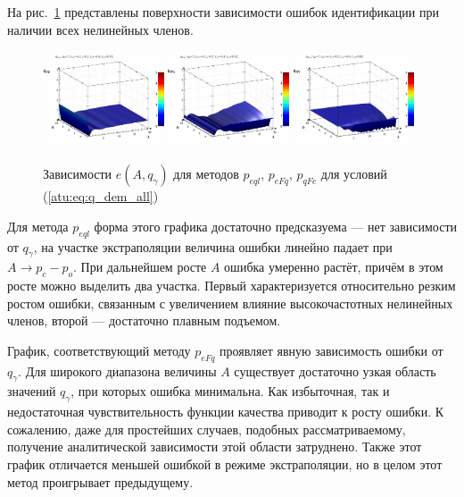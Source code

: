 На рис.~\ref{atu:f:qsl_pe_A_qg_all} представлены поверхности зависимости ошибок идентификации
при наличии всех нелинейных членов.


\begin{figure}[htb!]
  \centerline{
    \includegraphics[width=0.32\textwidth]{p/qls_pe-p_A_qg_eql_all.png}
    \hfill
    \includegraphics[width=0.32\textwidth]{p/qls_pe-p_A_qg_eFq_all.png}
    \hfill
    \includegraphics[width=0.32\textwidth]{p/qls_pe-p_A_qg_eFc_all.png}
  }
  \caption{Зависимости $e(A,q_\gamma)$ для методов $p_{eql}$, $p_{eFq}$, $p_{qFc}$ для условий (\ref{atu:eq:q_dem_all})}
  \label{atu:f:qsl_pe_A_qg_all}
\end{figure}

Для метода $p_{eql}$
форма этого графика достаточно предсказуема --- нет зависимости от $q_\gamma$,
на участке экстраполяции величина ошибки линейно падает при $A \to p_c - p_o$. При дальнейшем росте $A$
ошибка умеренно растёт, причём в этом росте можно выделить два участка.
Первый характеризуется относительно резким ростом ошибки, связанным
с увеличением влияние высокочастотных нелинейных членов,
второй --- достаточно плавным подъемом.

График, соответствующий методу $p_{eFq}$ проявляет явную зависимость
ошибки от $q_\gamma$. Для широкого диапазона величины $A$
существует достаточно узкая область значений $q_\gamma$,
при которых ошибка минимальна. Как избыточная, так и недостаточная чувствительность
функции качества приводит к росту ошибки. К сожалению,
даже для простейших случаев, подобных рассматриваемому,
получение аналитической зависимости этой области затруднено.
Также этот график отличается меньшей ошибкой в режиме экстраполяции,
но в целом этот метод проигрывает предыдущему.

